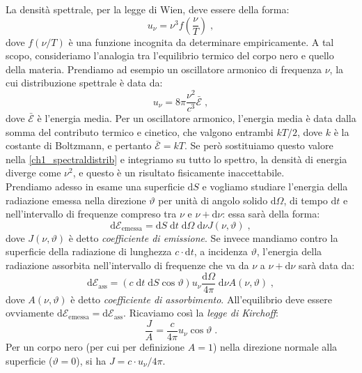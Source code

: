 \documentclass[10pt,a4paper]{report}
\theoremstyle{definition}
\numberwithin{equation}{section}
\newcommand{\diff}[1][]{\mathrm{d}#1}
\begin{document}
La densità spettrale, per la legge di Wien, deve essere della forma:
$$
u_{\nu}=\nu^3 f\left(\frac{\nu}{T}\right)\;,
$$
dove $f(\nu/T)$ è una funzione incognita da determinare empiricamente. A tal scopo, consideriamo l'analogia tra l'equilibrio termico del corpo nero e quello della materia. Prendiamo ad esempio un oscillatore armonico di frequenza $\nu$, la cui distribuzione spettrale è data da:
\begin{equation}
u_{\nu}=8\pi\frac{\nu^2}{c^3}\bar{\mathcal{E}}\;, \label{ch1_spectraldistrib}
\end{equation}
dove $\bar{\mathcal{E}}$ è l'energia media. Per un oscillatore armonico, l'energia media è data dalla somma del contributo termico e cinetico, che valgono entrambi $kT/2$, dove $k$ è la costante di Boltzmann, e pertanto $\bar{\mathcal{E}}=kT$. Se però sostituiamo questo valore nella \eqref{ch1_spectraldistrib} e integriamo su tutto lo spettro, la densità di energia diverge come $\nu^2$, e questo è un risultato fisicamente inaccettabile. \\
Prendiamo adesso in esame una superficie $\diff{S}$ e vogliamo studiare l'energia della radiazione emessa nella direzione $\vartheta$ per unità di angolo solido $\diff{\Omega}$, di tempo $\diff{t}$ e nell'intervallo di frequenze compreso tra $\nu$ e $\nu+\diff{\nu}$: essa sarà della forma:
\begin{equation}
\diff{\mathcal{E}_{\mathrm{emessa}}}=\diff{S}\;\diff{t}\;\diff{\Omega}\;\diff{\nu}J(\nu,\vartheta)\;,
\end{equation}
dove $J(\nu,\vartheta)$ è detto \textit{coefficiente di emissione}. Se invece mandiamo contro la superficie della radiazione di lunghezza $c\cdot \diff{t}$, a incidenza $\vartheta$, l'energia della radiazione assorbita nell'intervallo di frequenze che va da $\nu$ a $\nu+\diff{\nu}$ sarà data da:
\begin{equation}
\diff{\mathcal{E}_{\mathrm{ass}}}=(c\;\diff{t}\;\diff{S}\cos\vartheta)u_{\nu}\frac{\diff{\Omega}}{4\pi}\;\diff{\nu}A(\nu,\vartheta)\;,
\end{equation}
dove $A(\nu,\vartheta)$ è detto \textit{coefficiente di assorbimento}. All'equilibrio deve essere ovviamente $\diff{\mathcal{E}_{\mathrm{emessa}}}=\diff{\mathcal{E}_{\mathrm{ass}}}$. Ricaviamo così la \textit{legge di Kirchoff}:
\begin{equation}
\frac{J}{A}=\frac{c}{4\pi}u_{\nu}\cos\vartheta\;. \label{ch1_kirchofflaw}
\end{equation}
Per un corpo nero (per cui per definizione $A=1$) nella direzione normale alla superficie ($\vartheta=0$), si ha $J=c\cdot u_{\nu}/4\pi$. \\
\end{document}
